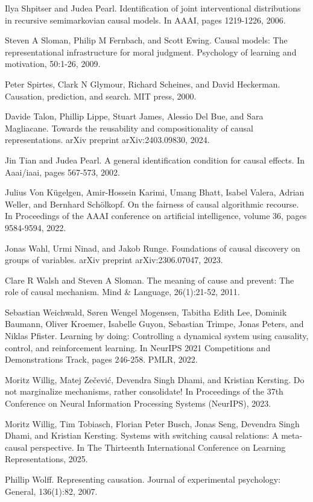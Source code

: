 \documentclass[10pt]{article}
\begin{document}
Ilya Shpitser and Judea Pearl. Identification of joint interventional distributions in recursive semimarkovian causal models. In AAAI, pages 1219-1226, 2006.

Steven A Sloman, Philip M Fernbach, and Scott Ewing. Causal models: The representational infrastructure for moral judgment. Psychology of learning and motivation, 50:1-26, 2009.

Peter Spirtes, Clark N Glymour, Richard Scheines, and David Heckerman. Causation, prediction, and search. MIT press, 2000.

Davide Talon, Phillip Lippe, Stuart James, Alessio Del Bue, and Sara Magliacane. Towards the reusability and compositionality of causal representations. arXiv preprint arXiv:2403.09830, 2024.

Jin Tian and Judea Pearl. A general identification condition for causal effects. In Aaai/iaai, pages 567-573, 2002.

Julius Von Kügelgen, Amir-Hossein Karimi, Umang Bhatt, Isabel Valera, Adrian Weller, and Bernhard Schölkopf. On the fairness of causal algorithmic recourse. In Proceedings of the AAAI conference on artificial intelligence, volume 36, pages 9584-9594, 2022.

Jonas Wahl, Urmi Ninad, and Jakob Runge. Foundations of causal discovery on groups of variables. arXiv preprint arXiv:2306.07047, 2023.

Clare R Walsh and Steven A Sloman. The meaning of cause and prevent: The role of causal mechanism. Mind \& Language, 26(1):21-52, 2011.

Sebastian Weichwald, Søren Wengel Mogensen, Tabitha Edith Lee, Dominik Baumann, Oliver Kroemer, Isabelle Guyon, Sebastian Trimpe, Jonas Peters, and Niklas Pfister. Learning by doing: Controlling a dynamical system using causality, control, and reinforcement learning. In NeurIPS 2021 Competitions and Demonstrations Track, pages 246-258. PMLR, 2022.

Moritz Willig, Matej Zečević, Devendra Singh Dhami, and Kristian Kersting. Do not marginalize mechanisms, rather consolidate! In Proceedings of the 37th Conference on Neural Information Processing Systems (NeurIPS), 2023.

Moritz Willig, Tim Tobiasch, Florian Peter Busch, Jonas Seng, Devendra Singh Dhami, and Kristian Kersting. Systems with switching causal relations: A meta-causal perspective. In The Thirteenth International Conference on Learning Representations, 2025.

Phillip Wolff. Representing causation. Journal of experimental psychology: General, 136(1):82, 2007.
\end{document}
